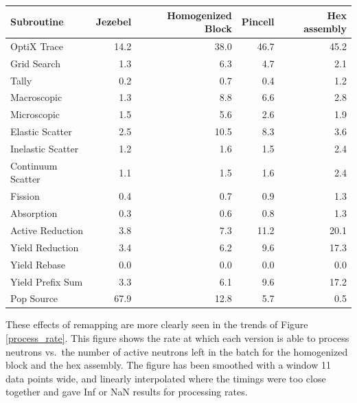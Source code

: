 \begin{table}[h!]
\begin{tabular}{| l | r  | r | r | r |}
 \hline
Subroutine         & Jezebel & Homogenized Block & Pincell & Hex assembly  \\
\hline \hline
 OptiX Trace       & 14.2       &      38.0            &   46.7    &    45.2     \\ \hline
 Grid Search       &  1.3      &        6.3                 &  4.7     &     2.1      \\ \hline
 Tally                   &  0.2      &         0.7               &   0.4    &    1.2       \\ \hline
 Macroscopic      &  1.3     &          8.8               &  6.6      &    2.8     \\ \hline
 Microscopic       &  1.5      &          5.6               &  2.6     &    1.9       \\ \hline
 Elastic Scatter   &  2.5      &        10.5                 &   8.3    &   3.6      \\ \hline
 Inelastic Scatter & 1.2       &        1.6                  &  1.5    &    2.4    \\ \hline
 Continuum Scatter & 1.1  &         1.5                 &   1.6   &    2.4   \\ \hline
 Fission               &  0.4      &         0.7                 &   0.9   &    1.3      \\ \hline
 Absorption          & 0.3       &         0.6                 &   0.8   &    1.3      \\ \hline
Active Reduction  &  3.8      &        7.3                  &   11.2   &  20.1        \\ \hline
 Yield Reduction  &   3.4     &        6.2                 &  9.6    &    17.3     \\ \hline
 Yield Rebase     &    0.0     &       0.0                   &   0.0  &    0.0    \\ \hline
 Yield Prefix Sum &   3.3    &       6.1                    &  9.6   &    17.2    \\ \hline
 Pop Source         &  67.9     &     12.8                    & 5.7    &    0.5    \\ 
\hline
\end{tabular}
\end{table}


These effects of remapping are more clearly seen in the trends of Figure \ref{process_rate}.  This figure shows the rate at which each version is able to process neutrons vs.\ the number of active neutrons left in the batch for the homogenized block and the hex assembly.  The figure has been smoothed with a window 11 data points wide,%
 and linearly interpolated where the timings were too close together and gave Inf or NaN results for processing rates.  
 
